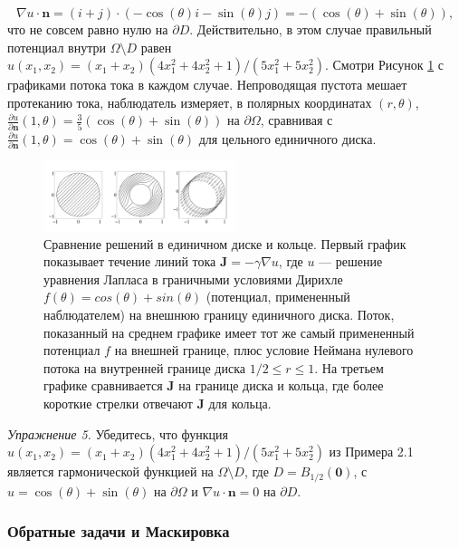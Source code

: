 \documentclass[a4paper, 12pt]{article}
\begin{document}
\begin{equation*}
\nabla u \cdot \textbf{n} = (i + j) \cdot (-\cos (\theta) i - \sin (\theta) j) = -(\cos(\theta)+\sin(\theta)),
\end{equation*}
что не совсем равно нулю на $\partial D$. Действительно, в этом случае
правильный потенциал внутри $\Omega \setminus D$ равен $u(x_1, x_2) =
(x_1 + x_2)(4x_1^2 + 4x_2^2 + 1)/(5x_1^2 + 5x_2^2)$. Смотри Рисунок
\ref{fig:3} с графиками потока тока в каждом случае. Непроводящая
пустота мешает протеканию тока, наблюдатель измеряет, в полярных
координатах $(r, \theta)$, $\frac{\partial u}{\partial \textbf{n}}(1,
\theta) = \frac{3}{5}(\cos(\theta)+\sin(\theta))$ на $\partial
\Omega$, сравнивая с $\frac{\partial u}{\partial \textbf{n}}(1,
\theta) = \cos(\theta)+\sin(\theta)$ для цельного единичного диска.
\begin{figure}[t]
  \centering
  \includegraphics[width=0.5\textwidth]{3.png}
  \caption{Сравнение решений в единичном диске и кольце. Первый график показывает течение линий тока
    $\mathbf J = -\gamma \nabla u$, где $u$ --- решение уравнения Лапласа в граничными условиями Дирихле $f(\theta) =
    cos(\theta) + sin(\theta)$ (потенциал, примененный наблюдателем) на внешнюю границу единичного диска. Поток, показанный на среднем графике имеет тот же самый примененный потенциал  $f$ на внешней границе, плюс условие Неймана нулевого потока на внутренней границе диска
    $1/2 \leq r \leq 1$. На третьем графике сравнивается $\mathbf J$ на границе диска и кольца, где более короткие стрелки отвечают  $\mathbf J$ для кольца.}
  \label{fig:3}
\end{figure}


\textit{Упражнение 5.\;} Убедитесь, что функция $u(x_1, x_2) = (x_1 + x_2)(4x_1^2 + 4x_2^2 + 1)/(5x_1^2 + 5x_2^2)$ из Примера 2.1 является гармонической функцией на $\Omega \setminus D$, где $D = B_{1/2}(\textbf{0})$, с $u = \cos(\theta)+\sin(\theta)$ на $\partial \Omega$ и $\nabla u \cdot \textbf{n} = 0$ на $\partial D$.
\subsubsection{Обратные задачи и Маскировка}
\end{document}
